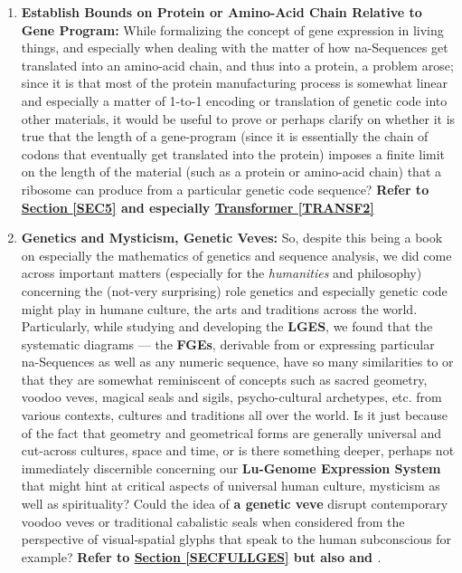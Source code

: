 \documentclass[a4paper, 18pt]{book} %
\begin{document}
\begin{enumerate}
\item \textbf{Establish Bounds on Protein or Amino-Acid Chain Relative to Gene Program:} While formalizing the concept of gene expression in living things, and especially when dealing with the matter of how na-Sequences get translated into an amino-acid chain, and thus into a protein, a problem arose; since it is that most of the protein manufacturing process is somewhat linear and especially a matter of 1-to-1 encoding or translation of genetic code into other materials, it would be useful to prove or perhaps clarify on whether it is true that the length of a gene-program (since it is essentially the chain of codons that eventually get translated into the protein) imposes a finite limit on the length of the material (such as a protein or amino-acid chain) that a ribosome can produce from a particular genetic code sequence? \textbf{Refer to \textbf{\hyperref[SEC5]{Section \ref{SEC5}}} and especially \textbf{\hyperref[TRANSF2]{Transformer \ref{TRANSF2}}}} 


\item \textbf{Genetics and Mysticism, Genetic Veves:} So, despite this being a book on especially the mathematics of genetics and sequence analysis, we did come across important matters (especially for the \textit{humanities} and philosophy) concerning the (not-very surprising) role genetics and especially genetic code might play in humane culture, the arts and traditions across the world. Particularly, while studying and developing the \textbf{LGES}, we found that the systematic diagrams --- the \textbf{FGEs}, derivable from or expressing particular na-Sequences as well as any numeric sequence, have so many similarities to or that they are somewhat reminiscent of concepts such as sacred geometry, voodoo veves, magical seals and sigils, psycho-cultural archetypes, etc. from various contexts, cultures and traditions all over the world. Is it just because of the fact that geometry and geometrical forms are generally universal and cut-across cultures, space and time, or is there something deeper, perhaps not immediately discernible concerning our \textbf{Lu-Genome Expression System} that might hint at critical aspects of universal human culture, mysticism as well as spirituality? Could the idea of \textbf{a genetic veve} disrupt contemporary voodoo veves or traditional cabalistic seals when considered from the perspective of visual-spatial glyphs that speak to the human subconscious for example? \textbf{Refer to \textbf{\hyperref[SECFULLGES]{Section \ref{SECFULLGES}}} but also \cite{lutalo_2025_grimlumtauto} and \cite{Lutalo2025transpsy}}. 



\end{enumerate}
\end{document}

